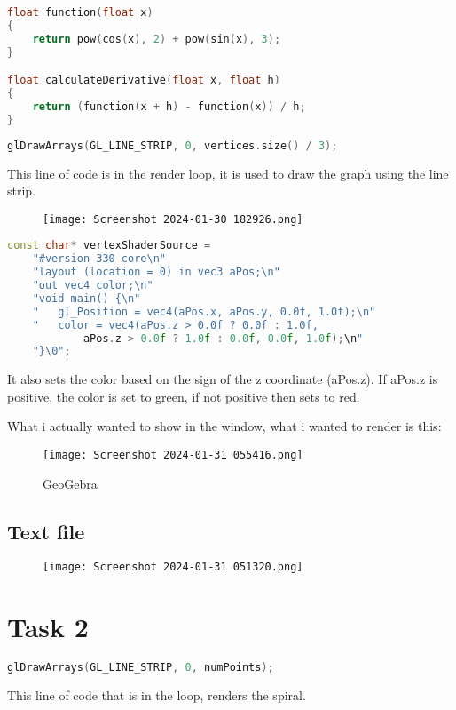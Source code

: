 \documentclass[12pt]{article}
\begin{document}
\begin{lstlisting}[language=C++, caption={Function and Derivative}]
float function(float x) 
{
    return pow(cos(x), 2) + pow(sin(x), 3);
}

float calculateDerivative(float x, float h) 
{
    return (function(x + h) - function(x)) / h;
}
\end{lstlisting}

\begin{lstlisting}[language=C++, caption={draws the graph}]
glDrawArrays(GL_LINE_STRIP, 0, vertices.size() / 3);
\end{lstlisting}
This line of code is in the render loop, it is used to draw the graph using the line strip.

\begin{figure}[htp]
\centering
\texttt{[image: Screenshot 2024-01-30 182926.png]}
\caption{\label{fig:c++ Graph}  }
\end{figure}
\begin{lstlisting}[language=C++, caption={Positiv green, negativ red}]
const char* vertexShaderSource = 
	"#version 330 core\n"
	"layout (location = 0) in vec3 aPos;\n"
	"out vec4 color;\n"
	"void main() {\n"
	"   gl_Position = vec4(aPos.x, aPos.y, 0.0f, 1.0f);\n"
	"   color = vec4(aPos.z > 0.0f ? 0.0f : 1.0f, 
            aPos.z > 0.0f ? 1.0f : 0.0f, 0.0f, 1.0f);\n"
	"}\0";
\end{lstlisting}
It also sets the color based on the sign of the z coordinate (aPos.z). If aPos.z is positive, the color is set to green, if not positive then sets to red.

What i actually wanted to show in the window, what i wanted to render is this:
\begin{figure}[htp]
\centering
\texttt{[image: Screenshot 2024-01-31 055416.png]}
\caption{\label{fig:GeoGebra Graph} GeoGebra }
\end{figure}

\subsection{Text file}
\begin{figure}[htp]
\centering
\texttt{[image: Screenshot 2024-01-31 051320.png]}
\caption{\label{fig:c++ data-points.txt} }
\end{figure}



\newpage
\section{Task 2}
\begin{lstlisting}[language=C++, caption={draws the spiral}]
glDrawArrays(GL_LINE_STRIP, 0, numPoints);
\end{lstlisting}
This line of code that is in the loop, renders the spiral.
\end{document}
